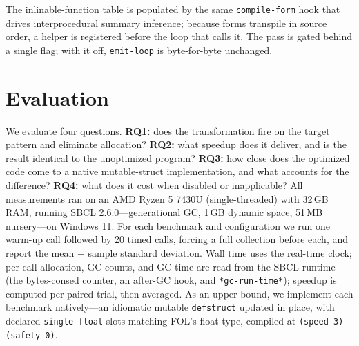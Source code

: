 \documentclass[sigplan,screen,review,anonymous]{acmart}
\begin{document}
The inlinable-function table is populated by the same \texttt{compile-form} hook
that drives interprocedural summary inference; because forms transpile
in source order, a helper is registered before the loop that calls it. The pass
is gated behind a single flag; with it off, \texttt{emit-loop} is
byte-for-byte unchanged.

\section{Evaluation}
\label{sec:eval}

We evaluate four questions. \textbf{RQ1:} does the transformation fire on the
target pattern and eliminate allocation? \textbf{RQ2:} what speedup does it
deliver, and is the result identical to the unoptimized program? \textbf{RQ3:}
how close does the optimized code come to a native mutable-struct implementation,
and what accounts for the difference? \textbf{RQ4:} what does it cost when
disabled or inapplicable? All measurements ran on an AMD Ryzen 5 7430U
(single-threaded) with 32\,GB RAM, running SBCL 2.6.0---generational GC,
1\,GB dynamic space, 51\,MB nursery---on Windows 11. For each benchmark and
configuration we run one warm-up call followed by 20 timed calls, forcing a
full collection before each, and report the mean $\pm$ sample standard deviation.
Wall time uses the real-time clock; per-call allocation, GC counts, and GC
time are read from the SBCL runtime (the bytes-consed
counter, an after-GC hook, and \texttt{*gc-run-time*}); speedup is computed per
paired trial, then averaged. As an upper bound, we implement each
benchmark natively---an idiomatic mutable \texttt{defstruct} updated in place,
with declared \texttt{single-float} slots matching FOL's float type, compiled at
\texttt{(speed 3) (safety 0)}.
\end{document}
